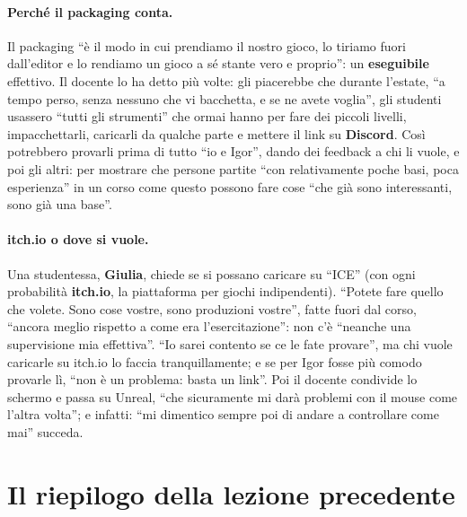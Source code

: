 \paragraph{Perché il packaging conta.} Il packaging ``è il modo in cui prendiamo il nostro
gioco, lo tiriamo fuori dall'editor e lo rendiamo un gioco a sé stante vero e proprio'': un
\textbf{eseguibile} effettivo. Il docente lo ha detto più volte: gli piacerebbe che durante
l'estate, ``a tempo perso, senza nessuno che vi bacchetta, e se ne avete voglia'', gli
studenti usassero ``tutti gli strumenti'' che ormai hanno per fare dei piccoli livelli,
impacchettarli, caricarli da qualche parte e mettere il link su \textbf{Discord}. Così
potrebbero provarli prima di tutto ``io e Igor'', dando dei feedback a chi li vuole, e poi gli
altri: per mostrare che persone partite ``con relativamente poche basi, poca esperienza'' in
un corso come questo possono fare cose ``che già sono interessanti, sono già una base''.

\paragraph{itch.io o dove si vuole.} Una studentessa, \textbf{Giulia}, chiede se si possano
caricare su ``ICE'' (con ogni probabilità \textbf{itch.io}, la piattaforma per giochi
indipendenti). ``Potete fare quello che volete. Sono cose vostre, sono produzioni vostre'',
fatte fuori dal corso, ``ancora meglio rispetto a come era l'esercitazione'': non c'è
``neanche una supervisione mia effettiva''. ``Io sarei contento se ce le fate provare'', ma
chi vuole caricarle su itch.io lo faccia tranquillamente; e se per Igor fosse più comodo
provarle lì, ``non è un problema: basta un link''. Poi il docente condivide lo schermo e
passa su Unreal, ``che sicuramente mi darà problemi con il mouse come l'altra volta''; e
infatti: ``mi dimentico sempre poi di andare a controllare come mai'' succeda.

\section{Il riepilogo della lezione precedente}
\label{ue16:sec:riepilogo}

